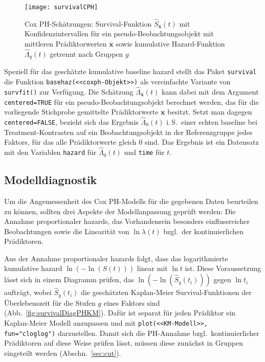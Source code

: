 \begin{figure}[ht]
\centering
\texttt{[image: survivalCPH]}
\vspace*{-1em}
\caption{Cox PH-Schätzungen: Survival-Funktion $\hat{S}_{\overline{\bm{x}}}(t)$ mit Konfidenzintervallen für ein pseudo-Beobachtungsobjekt mit mittleren Prädiktorwerten $\overline{\bm{x}}$ sowie kumulative Hazard-Funktion $\hat{\Lambda}_{g}(t)$ getrennt nach Gruppen $g$}
\label{fig:survivalCPH}
\end{figure}

Speziell für das geschätzte kumulative baseline hazard stellt das Paket \lstinline!survival! die Funktion \lstinline!basehaz(<<coxph-Objekt>>)! als vereinfachte Variante von \lstinline!survfit()! zur Verfügung. Die Schätzung $\hat{\Lambda}_{\overline{\bm{x}}}(t)$ kann dabei mit dem Argument \lstinline!centered=TRUE! für ein pseudo-Beobachtungsobjekt berechnet werden, das für die vorliegende Stichprobe gemittelte Prädiktorwerte $\overline{\bm{x}}$ besitzt. Setzt man dagegen \lstinline!centered=FALSE!, bezieht sich das Ergebnis $\hat{\Lambda}_{0}(t)$ i.\,S.\ einer echten baseline bei Treatment-Kontrasten auf ein Beobachtungsobjekt in der Referenzgruppe jedes Faktors, für das alle Prädiktorwerte gleich $0$ sind. Das Ergebnis ist ein Datensatz mit den Variablen \lstinline!hazard! für $\hat{\Lambda}_{0}(t)$ und \lstinline!time! für $t$.

\subsection{Modelldiagnostik}

Um die Angemessenheit des Cox PH-Modells für die gegebenen Daten beurteilen zu können, sollten drei Aspekte der Modellanpassung geprüft werden: Die Annahme proportionaler hazards, das Vorhandensein besonders einflussreicher Beobachtungen sowie die Linearität von $\ln \lambda(t)$ bzgl.\ der kontinuierlichen Prädiktoren.

Aus der Annahme proportionaler hazards folgt, dass das logarithmierte kumulative hazard $\ln(-\ln(S(t)))$ linear mit $\ln t$ ist. Diese Voraussetzung lässt sich in einem Diagramm prüfen, das $\ln(-\ln(\hat{S}_{g}(t_{i})))$ gegen $\ln t_{i}$ aufträgt, wobei $\hat{S}_{g}(t_{i})$ die geschätzten Kaplan-Meier Survival-Funktionen der Überlebenszeit für die Stufen $g$ eines Faktors sind (Abb.\ \ref{fig:survivalDiagPHKM}). Dafür ist separat für jeden Prädiktor ein Kaplan-Meier Modell anzupassen und mit \lstinline!plot(<<KM-Modell>>, fun="cloglog")! darzustellen. Damit sich die PH-Annahme bzgl.\ kontinuierlicher Prädiktoren auf diese Weise prüfen lässt, müssen diese zunächst in Gruppen eingeteilt werden (Abschn.\ \ref{sec:cut}).

